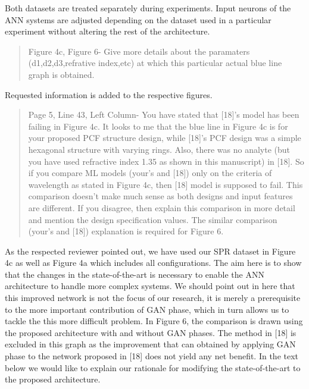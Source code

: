 \documentclass{article}
\begin{document}
	Both datasets are treated separately during experiments. Input neurons of the ANN systems are adjusted depending on the dataset used in a particular experiment without altering the rest of the architecture.
	
	
	\begin{quote}
	Figure 4c, Figure 6- Give more details about the paramaters (d1,d2,d3,refrative index,etc) at which this particular actual blue line graph is obtained.
	\end{quote}

	Requested information is added to the respective figures.
	
	
	\begin{quote}
	Page 5, Line 43, Left Column- You have stated that [18]'s model has been failing in Figure 4c. It looks to me that the blue line in Figure 4c is for your proposed PCF structure design, while [18]'s PCF design was a simple hexagonal structure with varying rings. Also, there was no analyte (but you have used refractive index 1.35 as shown in this manuscript) in [18]. So if you compare ML models (your's and [18]) only on the criteria of wavelength as stated in Figure 4c, then [18] model is supposed to fail. This comparison doesn't make much sense as both designs and input features are different. If you disagree, then explain this comparison in more detail and mention the design specification values.
	The similar comparison (your's and [18]) explanation is required for Figure 6.
	\end{quote}
	
	As the respected reviewer pointed out, we have used our SPR dataset in Figure 4c as well as Figure 4a which includes all configurations. The aim here is to show that the changes in the state-of-the-art is necessary to enable the ANN architecture to handle more complex systems. We should point out in here that this improved network is not the focus of our research, it is merely a prerequisite to the more important contribution of GAN phase, which in turn allows us to tackle the this more difficult problem. In Figure 6, the comparison is drawn using the proposed architecture with and without GAN phases. The method in [18] is excluded in this graph as the improvement that can obtained by applying GAN phase to the network proposed in [18] does not yield any net benefit. In the text below we would like to explain our rationale for modifying the state-of-the-art to the proposed architecture.
	
\end{document}
